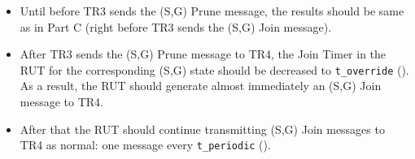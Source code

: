 \documentclass[11pt]{report}
\begin{document}

\begin{itemize}

  \item Until before TR3 sends the (S,G) Prune message, the results should
  be same as in Part C (right before TR3 sends the (S,G) Join message).

  \item After TR3 sends the (S,G) Prune message to TR4,
  the Join Timer in the RUT for the corresponding (S,G) state
  should be decreased to \verb=t_override= ({\PimsmTOverride}). As a result,
  the RUT should generate almost immediately an (S,G) Join message to TR4.

  \item After that the RUT should continue transmitting 
  (S,G) Join messages to TR4 as normal: one message every \verb=t_periodic=
  ({\PimsmTPeriodic}).

\end{itemize}

\end{document}
